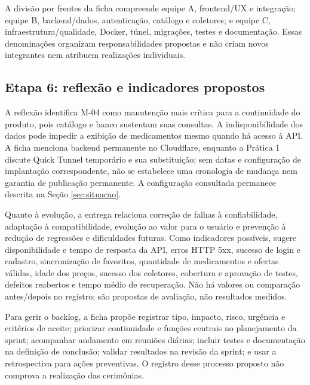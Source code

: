 A divisão por frentes da ficha compreende equipe A, frontend/UX e integração; equipe B, backend/dados, autenticação, catálogo e coletores; e equipe C, infraestrutura/qualidade, Docker, túnel, migrações, testes e documentação. Essas denominações organizam responsabilidades propostas e não criam novos integrantes nem atribuem realizações individuais.

\subsection{Etapa 6: reflexão e indicadores propostos}

A reflexão identifica M-04 como manutenção mais crítica para a continuidade do produto, pois catálogo e banco sustentam suas consultas. A indisponibilidade dos dados pode impedir a exibição de medicamentos mesmo quando há acesso à API. A ficha menciona backend permanente no Cloudflare, enquanto a Prática 1 discute Quick Tunnel temporário e sua substituição; sem datas e configuração de implantação correspondente, não se estabelece uma cronologia de mudança nem garantia de publicação permanente. A configuração consultada permanece descrita na Seção \ref{sec:situacao}.

Quanto à evolução, a entrega relaciona correção de falhas à confiabilidade, adaptação à compatibilidade, evolução ao valor para o usuário e prevenção à redução de regressões e dificuldades futuras. Como indicadores possíveis, sugere disponibilidade e tempo de resposta da API, erros HTTP 5xx, sucesso de login e cadastro, sincronização de favoritos, quantidade de medicamentos e ofertas válidas, idade dos preços, sucesso dos coletores, cobertura e aprovação de testes, defeitos reabertos e tempo médio de recuperação. Não há valores ou comparação antes/depois no registro; são propostas de avaliação, não resultados medidos.

Para gerir o backlog, a ficha propõe registrar tipo, impacto, risco, urgência e critérios de aceite; priorizar continuidade e funções centrais no planejamento da sprint; acompanhar andamento em reuniões diárias; incluir testes e documentação na definição de conclusão; validar resultados na revisão da sprint; e usar a retrospectiva para ações preventivas. O registro desse processo proposto não comprova a realização das cerimônias.
